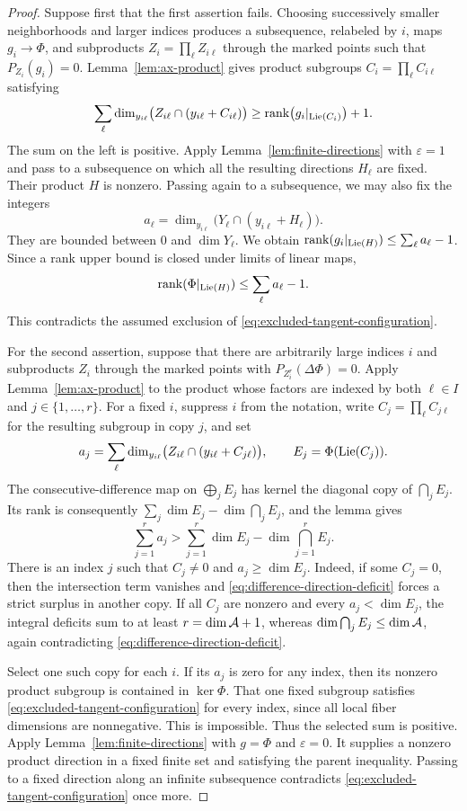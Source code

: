 \begin{proof}
Suppose first that the first assertion fails. Choosing successively
smaller neighborhoods and larger indices produces a subsequence,
relabeled by $i$, maps $g_i\longrightarrow\Phi$, and subproducts
$Z_i=\prod_\ell Z_{i\ell}$ through the marked points such that
$P_{Z_i}(g_i)=0$.
Lemma~\ref{lem:ax-product} gives product subgroups
$C_i=\prod_\ell C_{i\ell}$ satisfying
\[
 \sum_\ell\dim_{y_{i\ell}}
 \bigl(Z_{i\ell}\cap(y_{i\ell}+C_{i\ell})\bigr)
 \geq\operatorname{rank}\bigl(g_i|_{\operatorname{Lie}(C_i)}\bigr)+1.
\]
The sum on the left is positive. Apply
Lemma~\ref{lem:finite-directions} with $\varepsilon=1$ and pass to a
subsequence on which all the resulting directions $H_\ell$ are fixed.
Their product $H$ is nonzero. Passing again to a subsequence, we may
also fix the integers
\[
 a_\ell=\dim_{y_{i\ell}}
 \bigl(Y_\ell\cap(y_{i\ell}+H_\ell)\bigr).
\]
They are bounded between $0$ and $\dim Y_\ell$. We obtain
$\operatorname{rank}(g_i|_{\operatorname{Lie}(H)})\leq\sum_\ell a_\ell-1$.
Since a rank upper bound is closed under limits of linear maps,
\[
 \operatorname{rank}(\Phi|_{\operatorname{Lie}(H)})\leq\sum_\ell a_\ell-1.
\]
This contradicts the assumed exclusion of
\eqref{eq:excluded-tangent-configuration}.

For the second assertion, suppose that there are arbitrarily large
indices $i$ and subproducts $Z_i$ through the marked points with
$P_{Z_i^r}(\Delta\Phi)=0$. Apply Lemma~\ref{lem:ax-product} to the
product whose factors are indexed by both $\ell\in I$ and
$j\in\{1,\ldots,r\}$. For a fixed $i$, suppress $i$ from the notation,
write $C_j=\prod_\ell C_{j\ell}$ for the resulting subgroup in copy $j$,
and set
\[
 a_j=\sum_\ell\dim_{y_{i\ell}}
       \bigl(Z_{i\ell}\cap(y_{i\ell}+C_{j\ell})\bigr),
 \qquad E_j=\Phi(\operatorname{Lie}(C_j)).
\]
The consecutive-difference map on $\bigoplus_j E_j$ has kernel the
diagonal copy of $\bigcap_j E_j$. Its rank is consequently
$\sum_j\dim E_j-\dim\bigcap_j E_j$, and the lemma gives
\begin{equation}\label{eq:difference-direction-deficit}
 \sum_{j=1}^r a_j>
 \sum_{j=1}^r\dim E_j-\dim\bigcap_{j=1}^r E_j.
\end{equation}
There is an index $j$ such that $C_j\neq0$ and $a_j\geq\dim E_j$.
Indeed, if some $C_j=0$, then the intersection term vanishes and
\eqref{eq:difference-direction-deficit} forces a strict surplus in
another copy. If all $C_j$ are nonzero and every $a_j<\dim E_j$,
the integral deficits sum to at least
$r=\dim\mathcal A+1$, whereas $\dim\bigcap_jE_j\leq\dim\mathcal A$, again
contradicting \eqref{eq:difference-direction-deficit}.

Select one such copy for each $i$. If its $a_j$ is zero for any index,
then its nonzero product subgroup is contained in $\ker\Phi$.
That one fixed subgroup satisfies
\eqref{eq:excluded-tangent-configuration} for every index, since all
local fiber dimensions are nonnegative. This is impossible.
Thus the selected sum is positive. Apply
Lemma~\ref{lem:finite-directions} with $g=\Phi$ and $\varepsilon=0$.
It supplies a nonzero product direction in a fixed finite set and
satisfying the parent inequality. Passing to a fixed direction along
an infinite subsequence contradicts
\eqref{eq:excluded-tangent-configuration} once more.
\end{proof}

